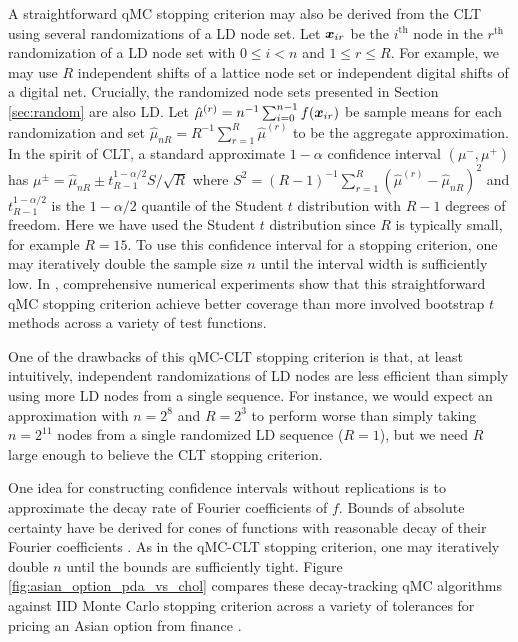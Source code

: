\documentclass{svproc}
\newcounter{algorithm}%
\begin{document}
A straightforward qMC stopping criterion may also be derived from the CLT using several randomizations of a LD node set. Let ${\boldsymbol{x}}_{ir}$ be the $i^\mathrm{th}$ node in the $r^\mathrm{th}$ randomization of a LD node set with $0 \leq i < n$ and $1 \leq r \leq R$. For example, we may use $R$ independent shifts of a lattice node set or independent digital shifts of a digital net. Crucially, the randomized node sets presented in Section \ref{sec:random} are also LD. Let $\hat{\mu}^{(r)} = n^{-1} \sum_{i=0}^{n-1} f({\boldsymbol{x}}_{ir})$ be sample means for each randomization and set $\hat{\mu}_{nR} = R^{-1} \sum_{r=1}^R \hat{\mu}^{(r)}$ to be the aggregate approximation. In the spirit of CLT, a standard approximate $1-\alpha$ confidence interval $(\mu^-,\mu^+)$ has $\mu^\pm = \hat{\mu}_{nR} \pm t_{R-1}^{1-\alpha/2} S/\sqrt{R}$ where $S^2 = (R-1)^{-1} \sum_{r=1}^R (\hat{\mu}^{(r)} - \hat{\mu}_{nR})^2$ and $t_{R-1}^{1-\alpha/2}$ is the $1-\alpha/2$ quantile of the Student $t$ distribution with $R-1$ degrees of freedom. Here we have used the Student $t$ distribution since $R$ is typically small, for example $R=15$. To use this confidence interval for a stopping criterion, one may iteratively double the sample size $n$ until the interval width is sufficiently low. In \cite{l2023confidence}, comprehensive numerical experiments show that this straightforward qMC stopping criterion achieve better coverage than more involved bootstrap $t$ methods across a variety of test functions. 

One of the drawbacks of this qMC-CLT stopping criterion is that, at least intuitively, independent randomizations of LD nodes are less efficient than simply using more LD nodes from a single sequence. For instance, we would expect an approximation with $n=2^8$ and $R=2^3$ to perform worse than simply taking $n=2^{11}$ nodes from a single randomized LD sequence ($R=1$), but we need $R$ large enough to believe the CLT stopping criterion. 

One idea for constructing confidence intervals without replications is to approximate the decay rate of Fourier coefficients of $f$. Bounds of absolute certainty have be derived for cones of functions with reasonable decay of their Fourier coefficients \cite{HicEtal17a}. As in the qMC-CLT stopping criterion, one may iteratively double $n$ until the bounds are sufficiently tight. Figure \ref{fig:asian_option_pda_vs_chol} compares these decay-tracking qMC algorithms against IID Monte Carlo stopping criterion across a variety of tolerances for pricing an Asian option from finance \cite[p.\ 8]{Gla03}.
\end{document}
